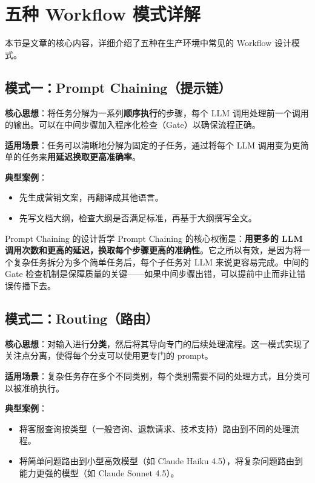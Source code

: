 \section{五种 Workflow 模式详解}

本节是文章的核心内容，详细介绍了五种在生产环境中常见的 Workflow 设计模式。

\subsection{模式一：Prompt Chaining（提示链）}

\textbf{核心思想}：将任务分解为一系列\textbf{顺序执行}的步骤，每个 LLM 调用处理前一个调用的输出。可以在中间步骤加入程序化检查（Gate）以确保流程正确。

\textbf{适用场景}：任务可以清晰地分解为固定的子任务，通过将每个 LLM 调用变为更简单的任务来\textbf{用延迟换取更高准确率}。

\textbf{典型案例}：
\begin{itemize}
    \item 先生成营销文案，再翻译成其他语言。
    \item 先写文档大纲，检查大纲是否满足标准，再基于大纲撰写全文。
\end{itemize}

\begin{importantbox}{Prompt Chaining 的设计哲学}
Prompt Chaining 的核心权衡是：\textbf{用更多的 LLM 调用次数和更高的延迟，换取每个步骤更高的准确性}。它之所以有效，是因为将一个复杂任务拆分为多个简单任务后，每个子任务对 LLM 来说更容易完成。中间的 Gate 检查机制是保障质量的关键——如果中间步骤出错，可以提前中止而非让错误传播下去。
\end{importantbox}

\subsection{模式二：Routing（路由）}

\textbf{核心思想}：对输入进行\textbf{分类}，然后将其导向专门的后续处理流程。这一模式实现了关注点分离，使得每个分支可以使用更专门的 prompt。

\textbf{适用场景}：复杂任务存在多个不同类别，每个类别需要不同的处理方式，且分类可以被准确执行。

\textbf{典型案例}：
\begin{itemize}
    \item 将客服查询按类型（一般咨询、退款请求、技术支持）路由到不同的处理流程。
    \item 将简单问题路由到小型高效模型（如 Claude Haiku 4.5），将复杂问题路由到能力更强的模型（如 Claude Sonnet 4.5）。
\end{itemize}

